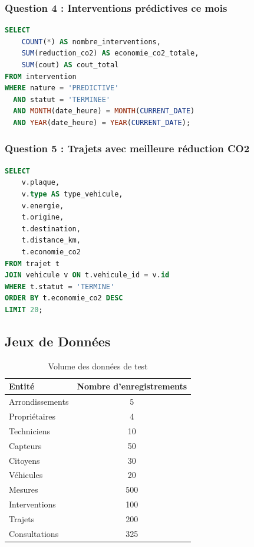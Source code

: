 \documentclass[12pt,a4paper]{article}
\begin{document}
\subsubsection{Question 4 : Interventions prédictives ce mois}

\begin{lstlisting}[language=SQL]
SELECT 
    COUNT(*) AS nombre_interventions,
    SUM(reduction_co2) AS economie_co2_totale,
    SUM(cout) AS cout_total
FROM intervention
WHERE nature = 'PREDICTIVE'
  AND statut = 'TERMINEE'
  AND MONTH(date_heure) = MONTH(CURRENT_DATE)
  AND YEAR(date_heure) = YEAR(CURRENT_DATE);
\end{lstlisting}

\subsubsection{Question 5 : Trajets avec meilleure réduction CO2}

\begin{lstlisting}[language=SQL]
SELECT 
    v.plaque,
    v.type AS type_vehicule,
    v.energie,
    t.origine,
    t.destination,
    t.distance_km,
    t.economie_co2
FROM trajet t
JOIN vehicule v ON t.vehicule_id = v.id
WHERE t.statut = 'TERMINE'
ORDER BY t.economie_co2 DESC
LIMIT 20;
\end{lstlisting}

\subsection{Jeux de Données}

\begin{table}[h]
\centering
\begin{tabular}{|l|c|}
\hline
\textbf{Entité} & \textbf{Nombre d'enregistrements} \\
\hline
Arrondissements & 5 \\
Propriétaires & 4 \\
Techniciens & 10 \\
Capteurs & 50 \\
Citoyens & 30 \\
Véhicules & 20 \\
Mesures & 500 \\
Interventions & 100 \\
Trajets & 200 \\
Consultations & 325 \\
\hline
\end{tabular}
\caption{Volume des données de test}
\end{table}
\end{document}
